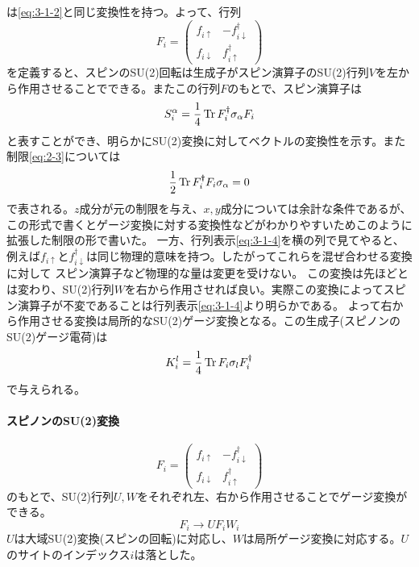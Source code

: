 \documentclass[11pt, aps, longbibliography]{article}
\begin{document}
        は\eqref{eq:3-1-2}と同じ変換性を持つ。よって、行列
        \begin{equation}\label{eq:3-1-4}
            F_i = \begin{pmatrix}
                f_{i\uparrow} & -f_{i\downarrow}^\dagger \\ f_{i\downarrow} & f_{i\uparrow}^\dagger
            \end{pmatrix}
        \end{equation}
        を定義すると、スピンのSU(2)回転は生成子がスピン演算子のSU(2)行列$V$を左から作用させることでできる。またこの行列$F$のもとで、スピン演算子は
        \begin{equation}\label{eq:3-1-5}
            S_i^\alpha = \frac{1}{4}\Tr F_i^\dagger \sigma_\alpha F_i
        \end{equation}
        と表すことができ、明らかにSU(2)変換に対してベクトルの変換性を示す。また制限\eqref{eq:2-3}については
        \begin{equation}\label{eq:3-1-9}
            \frac{1}{2}\Tr F_i^\dagger F_i \sigma_\alpha = 0
        \end{equation}
        で表される。$z$成分が元の制限を与え、$x,y$成分については余計な条件であるが、この形式で書くとゲージ変換に対する変換性などがわかりやすいためこのように拡張した制限の形で書いた。
        一方、行列表示\eqref{eq:3-1-4}を横の列で見てやると、例えば$f_{i\uparrow}$と$f_{i\downarrow}^\dagger$は同じ物理的意味を持つ。したがってこれらを混ぜ合わせる変換に対して
        スピン演算子など物理的な量は変更を受けない。
        この変換は先ほどとは変わり、SU(2)行列$W$を右から作用させれば良い。実際この変換によってスピン演算子が不変であることは行列表示\eqref{eq:3-1-4}より明らかである。
        よって右から作用させる変換は局所的なSU(2)ゲージ変換となる。この生成子(スピノンのSU(2)ゲージ電荷)は
        \begin{equation}\label{eq:3-1-6}
            K_i^l = \frac{1}{4} \Tr F_i \sigma_l F_i^\dagger
        \end{equation}
        で与えられる。
        \begin{tcolorbox}
            \paragraph{スピノンのSU(2)変換}
            \begin{equation}\label{eq:3-1-7}
                F_i = \begin{pmatrix}
                    f_{i\uparrow} & -f_{i\downarrow}^\dagger \\ f_{i\downarrow} & f_{i\uparrow}^\dagger
                \end{pmatrix}
            \end{equation}
            のもとで、SU(2)行列$U,W$をそれぞれ左、右から作用させることでゲージ変換ができる。
            \begin{equation}\label{eq:3-1-8}
                F_i \rightarrow UF_iW_i
            \end{equation}
            $U$は大域SU(2)変換(スピンの回転)に対応し、$W$は局所ゲージ変換に対応する。$U$のサイトのインデックス$i$は落とした。
        \end{tcolorbox}
\end{document}
